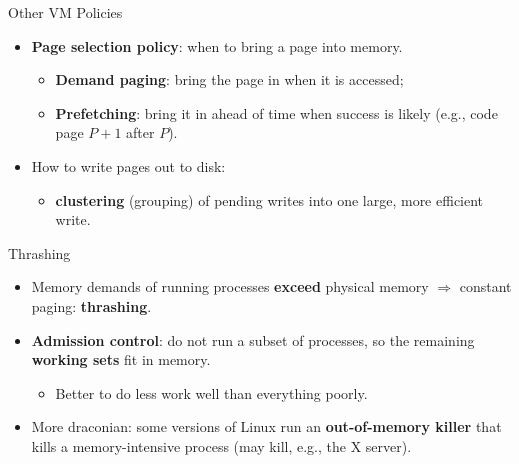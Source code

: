 \begin{frame}{Other VM Policies}

\begin{itemize}
    \item \textbf{Page selection policy}: when to bring a page into memory.
    \begin{itemize}
        \item \textbf{Demand paging}: bring the page in when it is accessed;
        \item \textbf{Prefetching}: bring it in ahead of time when success is
              likely (e.g., code page $P+1$ after $P$).
    \end{itemize}
    \item How to write pages out to disk:
    \begin{itemize}
        \item \textbf{clustering} (grouping) of pending writes into one large,
              more efficient write.
    \end{itemize}
\end{itemize}

\end{frame}

\begin{frame}{Thrashing}

\begin{itemize}
    \item Memory demands of running processes \textbf{exceed} physical
          memory $\Rightarrow$ constant paging: \textbf{thrashing}.
    \item \textbf{Admission control}: do not run a subset of processes, so
          the remaining \textbf{working sets} fit in memory.
    \begin{itemize}
        \item Better to do less work well than everything poorly.
    \end{itemize}
    \item More draconian: some versions of Linux run an
          \textbf{out-of-memory killer} that kills a memory-intensive process
          (may kill, e.g., the X server).
\end{itemize}

\end{frame}

